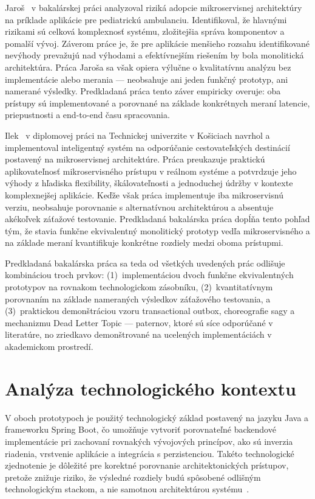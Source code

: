 Jaroš~\cite{Jaros2025} v bakalárskej práci analyzoval riziká adopcie mikroservisnej architektúry na príklade aplikácie pre pediatrickú ambulanciu. Identifikoval, že hlavnými rizikami sú celková komplexnosť systému, zložitejšia správa komponentov a pomalší vývoj. Záverom práce je, že pre aplikácie menšieho rozsahu identifikované nevýhody prevažujú nad výhodami a efektívnejším riešením by bola monolitická architektúra. Práca Jaroša sa však opiera výlučne o kvalitatívnu analýzu bez implementácie alebo merania — neobsahuje ani jeden funkčný prototyp, ani namerané výsledky. Predkladaná práca tento záver empiricky overuje: oba prístupy sú implementované a porovnané na základe konkrétnych meraní latencie, priepustnosti a end-to-end času spracovania.

Ilek~\cite{Ilek2025} v diplomovej práci na Technickej univerzite v Košiciach navrhol a implementoval inteligentný systém na odporúčanie cestovateľských destinácií postavený na mikroservisnej architektúre. Práca preukazuje praktickú aplikovateľnosť mikroservisného prístupu v reálnom systéme a potvrdzuje jeho výhody z hľadiska flexibility, škálovateľnosti a jednoduchej údržby v kontexte komplexnejšej aplikácie. Keďže však práca implementuje iba mikroservisnú verziu, neobsahuje porovnanie s alternatívnou architektúrou a absentuje akékoľvek záťažové testovanie. Predkladaná bakalárska práca dopĺňa tento pohľad tým, že stavia funkčne ekvivalentný monolitický prototyp vedľa mikroservisného a na základe meraní kvantifikuje konkrétne rozdiely medzi oboma prístupmi.

Predkladaná bakalárska práca sa teda od všetkých uvedených prác odlišuje kombináciou troch prvkov: (1)~implementáciou dvoch funkčne ekvivalentných prototypov na rovnakom technologickom zásobníku, (2)~kvantitatívnym porovnaním na základe nameraných výsledkov záťažového testovania, a (3)~praktickou demonštráciou vzoru transactional outbox, choreografie sagy a mechanizmu Dead Letter Topic — paternov, ktoré sú síce odporúčané v literatúre, no zriedkavo demonštrované na ucelených implementáciách v akademickom prostredí.

\section{Analýza technologického kontextu}

V oboch prototypoch je použitý technologický základ postavený na jazyku Java a frameworku Spring Boot, čo umožňuje vytvoriť porovnateľné backendové implementácie pri zachovaní rovnakých vývojových princípov, ako sú inverzia riadenia, vrstvenie aplikácie a integrácia s perzistenciou. Takéto technologické zjednotenie je dôležité pre korektné porovnanie architektonických prístupov, pretože znižuje riziko, že výsledné rozdiely budú spôsobené odlišným technologickým stackom, a nie samotnou architektúrou systému~\cite{SpringBootDocs2025,SpringWebRESTDocs2025}.

